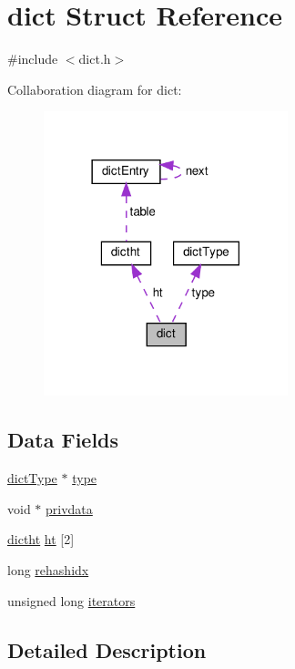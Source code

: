 \hypertarget{structdict}{}\section{dict Struct Reference}
\label{structdict}


{\ttfamily \#include $<$dict.\+h$>$}



Collaboration diagram for dict\+:
\nopagebreak
\begin{figure}[H]
\begin{center}
\leavevmode
\includegraphics[width=201pt]{structdict__coll__graph}
\end{center}
\end{figure}
\subsection*{Data Fields}
\begin{DoxyCompactItemize}
\item 
\hyperlink{structdict_type}{dict\+Type} $\ast$ \hyperlink{structdict_a2db48c015f8daf59c847bd365a95b676}{type}
\item 
void $\ast$ \hyperlink{structdict_ac5df247494dd66a10946e2d67e56b2a1}{privdata}
\item 
\hyperlink{structdictht}{dictht} \hyperlink{structdict_ac1f889148f33e6ade337231d349f3e60}{ht} \mbox{[}2\mbox{]}
\item 
long \hyperlink{structdict_a5bd2593dd4365889f62bfd2481287311}{rehashidx}
\item 
unsigned long \hyperlink{structdict_a36dec5053bd1001c3ffea08aba76ce95}{iterators}
\end{DoxyCompactItemize}


\subsection{Detailed Description}


